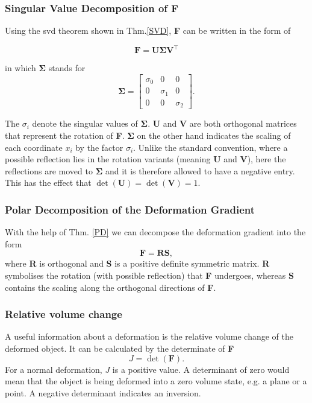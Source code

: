 \subsubsection{Singular Value Decomposition of F}

Using the \acrshort{svd} theorem shown in Thm.\ref{SVD}, \textbf{F} can be written in the form of

\begin{equation}\label{eq:svd_gradient}
\mathbf{F} = \mathbf{U \Sigma V^\intercal}
\end{equation}

in which $\mathbf{\Sigma}$ stands for
\begin{equation}\label{eq:svd_simga}
\mathbf{\Sigma} = \left[\begin{matrix}  \sigma_0 & 0 & 0 \\ 0 & \sigma_1 & 0 \\ 0 & 0 & \sigma_2 \end{matrix}\right] .
\end{equation}

The $\sigma_i$ denote the singular values of $\mathbf{\Sigma}$.
\textbf{U} and $\mathbf{V}$ are both orthogonal matrices that represent the rotation of \textbf{F}. $\mathbf{\Sigma}$ on the other hand indicates the scaling of each coordinate $x_i$ by the factor $\sigma_i$. Unlike the standard convention, where a possible reflection lies in the rotation variants (meaning \textbf{U} and \textbf{V}), here the reflections are moved to $\mathbf{\Sigma}$ and it is therefore allowed to have a negative entry. This has the effect that $\operatorname{det}(\mathbf{U}) = \operatorname{det}(\mathbf{V}) =1$.


\subsubsection{Polar Decomposition of the Deformation Gradient}
With the help of Thm. \ref{PD} we can decompose the deformation gradient into the form
\begin{equation}\label{PD_DG}
	\mathbf{F} = \mathbf{RS},
\end{equation}
where \textbf{R} is orthogonal and \textbf{S} is a positive definite symmetric matrix. \textbf{R} symbolises the rotation (with possible reflection) that \textbf{F} undergoes, whereas \textbf{S} contains the scaling along the orthogonal directions of \textbf{F}.

\subsubsection{Relative volume change}
A useful information about a deformation is the relative volume change of the deformed object. It can be calculated by the determinate of \textbf{F}
\begin{equation}\label{det_DG}
	J = \operatorname{det}(\mathbf{F}).
\end{equation}
For a normal deformation, $J$ is a positive value. A determinant of zero would mean that the object is being deformed into a zero volume state, e.g. a plane or a point. A negative determinant indicates an inversion.


